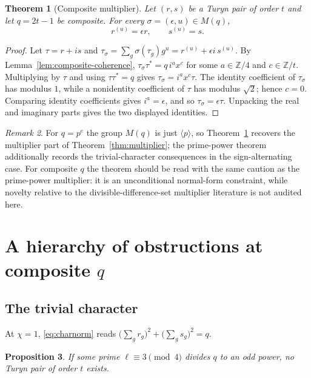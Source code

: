 \documentclass[11pt]{article}
\theoremstyle{plain}
\newtheorem{theorem}{Theorem}[section]
\newtheorem{proposition}[theorem]{Proposition}
\theoremstyle{definition}
\theoremstyle{remark}
\newtheorem{remark}[theorem]{Remark}
\newcommand{\Z}{\mathbb Z}
\begin{document}
\begin{theorem}[Composite multiplier]\label{thm:composite-multiplier}
Let $(r,s)$ be a Turyn pair of order $t$ and let $q=2t-1$ be composite. For every
$\sigma=(\epsilon,u)\in M(q)$,
\[
  r^{(u)}=\epsilon r,\qquad s^{(u)}=s .
\]
\end{theorem}

\begin{proof}
Let $\tau=r+is$ and
$\tau_\sigma=\sum_g\sigma(\tau_g)g^u=r^{(u)}+\epsilon i\,s^{(u)}$.
By Lemma~\ref{lem:composite-coherence}, $\tau_\sigma\tau^*=q\,i^a x^c$ for some
$a\in\Z/4$ and $c\in\Z/t$.
Multiplying by $\tau$ and using $\tau\tau^*=q$ gives
$\tau_\sigma=i^a x^c\tau$. The identity coefficient of $\tau_\sigma$ has
modulus $1$, while a nonidentity coefficient of $\tau$ has modulus $\sqrt2$;
hence $c=0$. Comparing identity coefficients gives $i^a=\epsilon$, and so
$\tau_\sigma=\epsilon\tau$. Unpacking the real and imaginary parts gives the two
displayed identities.
\end{proof}

\begin{remark}
For $q=p^e$ the group $M(q)$ is just $\langle p\rangle$, so
Theorem~\ref{thm:composite-multiplier} recovers the multiplier part of
Theorem~\ref{thm:multiplier}; the prime-power theorem additionally records the
trivial-character consequences in the sign-alternating case. For composite $q$
the theorem should be read with the same caution as the prime-power multiplier:
it is an unconditional normal-form constraint, while novelty relative to the
divisible-difference-set multiplier literature is not audited here.
\end{remark}

\section{A hierarchy of obstructions at composite \texorpdfstring{$q$}{q}}
\label{sec:hierarchy}

\subsection{The trivial character}\label{sec:twosquares}

At $\chi=1$, \eqref{eq:charnorm} reads $\bigl(\sum_g r_g\bigr)^2+\bigl(\sum_g
s_g\bigr)^2=q$.

\begin{proposition}\label{prop:twosquares}
If some prime $\ell\equiv3\pmod4$ divides $q$ to an odd power, no Turyn pair of
order $t$ exists.
\end{proposition}
\end{document}
